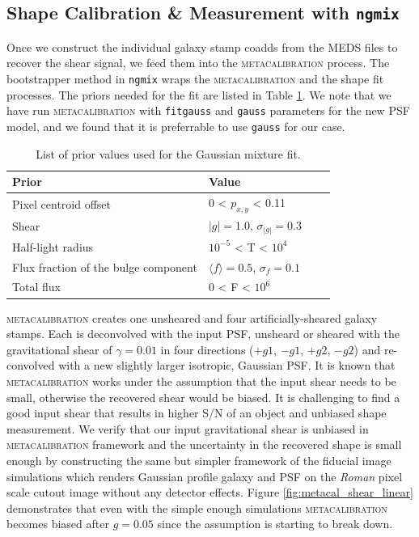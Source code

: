 \documentclass[fleqn,usenatbib]{mnras}
\begin{document}
\par

\subsection{Shape Calibration \& Measurement with \texttt{ngmix}}
\label{subsec:mcal}
Once we construct the individual galaxy stamp coadds from the MEDS files to recover the shear signal, we feed them into the \textsc{metacalibration} process. The bootstrapper method in \texttt{ngmix} wraps the \textsc{metacalibration} and the shape fit processes. The priors needed for the fit are listed in Table \ref{tab:priors}. We note that we have run \textsc{metacalibration} with \texttt{fitgauss} and \texttt{gauss} parameters for the new PSF model, and we found that it is preferrable to use \texttt{gauss} for our case.

\begin{table}
    \centering
    \begin{tabular}{|p{3cm}||p{3cm}|p{3cm}|p{3cm}|}
    \hline
    Prior & Value \\
    \hline
    Pixel centroid offset & 0 < $p_{x,y}$ < 0.11\\
    Shear & $|g|=1.0$, $\sigma_{|g|} = 0.3$\\
    Half-light radius & $10^{-5}$ < T < $10^{4}$\\
    Flux fraction of the bulge component & $\langle f\rangle = 0.5$, $\sigma_{f} = 0.1$\\
    Total flux & $0$ < F < $10^{6}$\\
    \hline
    \end{tabular}
    \caption{List of prior values used for the Gaussian mixture fit.}
    \label{tab:priors}
\end{table}

\textsc{metacalibration} creates one unsheared and four artificially-sheared galaxy stamps. Each is deconvolved with the input PSF, unsheard or sheared with the gravitational shear of $\gamma=0.01$ in four directions ($+g1$, $-g1$, $+g2$, $-g2$) and re-convolved with a new slightly larger isotropic, Gaussian PSF. It is known that \textsc{metacalibration} works under the assumption that the input shear needs to be small, otherwise the recovered shear would be biased. It is challenging to find a good input shear that results in higher S/N of an object and unbiased shape measurement. We verify that our input gravitational shear is unbiased in \textsc{metacalibration} framework and the uncertainty in the recovered shape is small enough by constructing the same but simpler framework of the fiducial image simulations which renders Gaussian profile galaxy and PSF on the \emph{Roman} pixel scale cutout image without any detector effects. Figure \ref{fig:metacal_shear_linear} demonstrates that even with the simple enough simulations \textsc{metacalibration} becomes biased after $g=0.05$ since the assumption is starting to break down. 
\end{document}
